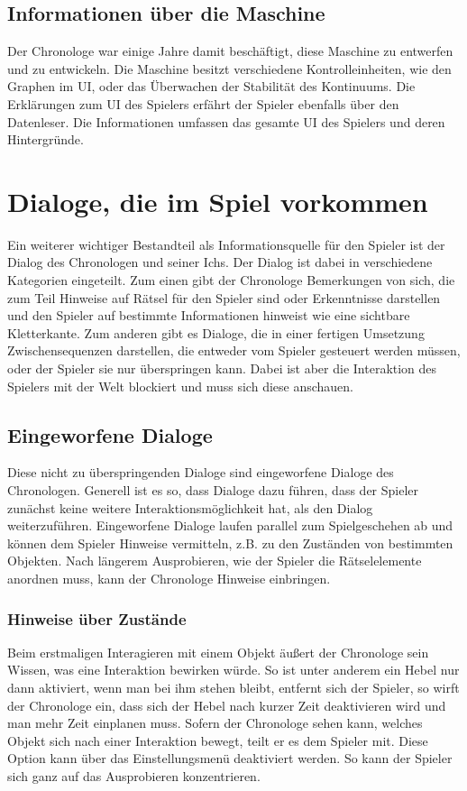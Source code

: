 \subsection{Informationen über die Maschine}
Der Chronologe war einige Jahre damit beschäftigt, diese Maschine zu entwerfen und zu entwickeln. Die Maschine besitzt verschiedene Kontrolleinheiten, wie den Graphen im \ac{UI}, oder das Überwachen der Stabilität des Kontinuums. Die Erklärungen zum \ac{UI} des Spielers erfährt der Spieler ebenfalls über den Datenleser. Die Informationen umfassen das gesamte \ac{UI} des Spielers und deren Hintergründe.

\section{Dialoge, die im Spiel vorkommen}
Ein weiterer wichtiger Bestandteil als Informationsquelle für den Spieler ist der Dialog des Chronologen und seiner Ichs. Der Dialog ist dabei in verschiedene Kategorien eingeteilt.
Zum einen gibt der Chronologe Bemerkungen von sich, die zum Teil Hinweise auf Rätsel für den Spieler sind oder Erkenntnisse darstellen und den Spieler auf bestimmte Informationen hinweist wie eine sichtbare Kletterkante.
Zum anderen gibt es Dialoge, die in einer fertigen Umsetzung Zwischensequenzen darstellen, die entweder vom Spieler gesteuert werden müssen, oder der Spieler sie nur überspringen kann. Dabei ist aber die Interaktion des Spielers mit der Welt blockiert und muss sich diese anschauen.

\subsection{Eingeworfene Dialoge}
Diese nicht zu überspringenden Dialoge sind eingeworfene Dialoge des Chronologen. Generell ist es so, dass Dialoge dazu führen, dass der Spieler zunächst keine weitere Interaktionsmöglichkeit hat, als den Dialog weiterzuführen. Eingeworfene Dialoge laufen parallel zum Spielgeschehen ab und können dem Spieler Hinweise vermitteln, z.B. zu den Zuständen von bestimmten Objekten. Nach längerem Ausprobieren, wie der Spieler die Rätselelemente anordnen muss, kann der Chronologe Hinweise einbringen.

\subsubsection{Hinweise über Zustände}
Beim erstmaligen Interagieren mit einem Objekt äußert der Chronologe sein Wissen, was eine Interaktion bewirken würde. So ist unter anderem ein Hebel nur dann aktiviert, wenn man bei ihm stehen bleibt, entfernt sich der Spieler, so wirft der Chronologe ein, dass sich der Hebel nach kurzer Zeit deaktivieren wird und man mehr Zeit einplanen muss. Sofern der Chronologe sehen kann, welches Objekt sich nach einer Interaktion bewegt, teilt er es dem Spieler mit. Diese Option kann über das Einstellungsmenü deaktiviert werden. So kann der Spieler sich ganz auf das Ausprobieren konzentrieren.

